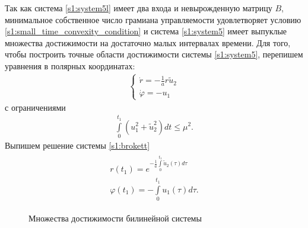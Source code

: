 \documentclass[../main.tex]{subfiles}
\begin{document}
Так как система \eqref{s1:system5l} имеет два входа и невырожденную матрицу $ B $, минимальное собственное число грамиана управляемости удовлетворяет условию \eqref{s1:small_time_convexity_condition} и система \eqref{s1:system5} имеет выпуклые множества достижимости на достаточно малых интервалах времени. 
Для того, чтобы построить точные области достижимости системы  \eqref{s1:system5}, перепишем уравнения в полярных координатах:
\begin{gather}\label{s1:brokett}
     \left\{ {\begin{array}{*{20}{c}}
             {\dot r =  - \frac{1}{a}r{\tilde u_2}}\\
             {\dot \varphi  =  - {u_1}}
     \end{array}} \right.
\end{gather}
с ограничениями
\begin{gather*}
    \int \limits_0^{t_1} \left( u_1^2 + \tilde{u}_2^2\right) dt \leqslant \mu^2.
\end{gather*}
Выпишем решение системы \eqref{s1:brokett}
\begin{gather*}
\begin{array}{l}
         r({t_1}) = {e^{ - \frac{1}{a}\int\limits_0^{{t_1}} {{{\tilde u}_2}} (\tau )d\tau }}\\
         \varphi ({t_1}) =  - \int\limits_0^{{t_1}} {{u_1}} (\tau )d\tau. 
\end{array}
\end{gather*}
\begin{figure}[h]
     \begin{minipage}[h]{0.5\linewidth}
     \end{minipage}
     \hfill
     \begin{minipage}[h]{0.5\linewidth}
     \end{minipage}
     \caption{Множества достижимости билинейной системы}
     \label{s1:fig:fig31}
\end{figure}
 
\end{document}

